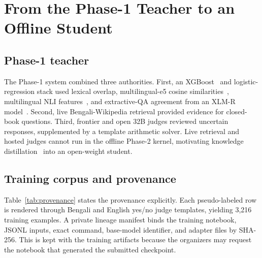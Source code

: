 \documentclass[11pt]{article}
\begin{document}
\section{From the Phase-1 Teacher to an Offline Student}

\subsection{Phase-1 teacher}

The Phase-1 system combined three authorities. First, an XGBoost~\citep{xgboost}
and logistic-regression stack used lexical overlap, multilingual-e5 cosine
similarities~\citep{e5}, multilingual NLI features~\citep{xnli}, and extractive-QA
agreement from an XLM-R model~\citep{xlmr}. Second, live Bengali-Wikipedia retrieval
provided evidence for closed-book questions. Third, frontier and open 32B judges
reviewed uncertain responses, supplemented by a template arithmetic solver. Live
retrieval and hosted judges cannot run in the offline Phase-2 kernel, motivating
knowledge distillation~\citep{distill} into an open-weight student.

\subsection{Training corpus and provenance}

\begin{table}[t]
\centering
\small
{}
\caption{Corpus roles. Phase-1 labels combine teacher judgments, rule-derived
labels, and human review. The 299 organizer labels do not update the judge, but
they are used for checkpoint selection and calibration; they are therefore a
development set rather than an untouched test set. The final feature stack is
fitted on all 1,907 rows after cross-fitted calibration.}
\label{tab:provenance}
\end{table}

Table~\ref{tab:provenance} states the provenance explicitly. Each pseudo-labeled
row is rendered through Bengali and English yes/no judge templates, yielding 3,216
training examples. A private lineage manifest binds the training notebook, JSONL
inputs, exact command, base-model identifier, and adapter files by SHA-256. This is
kept with the training artifacts because the organizers may request the notebook
that generated the submitted checkpoint.
\end{document}
